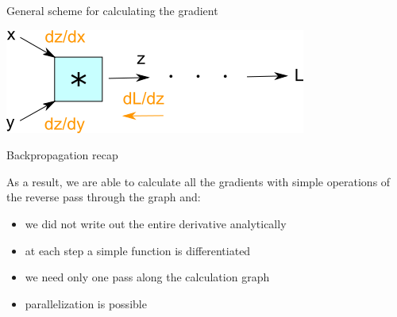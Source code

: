 \documentclass[fullscreen=true, bookmarks=true, hyperref={pdfencoding=unicode}]{beamer}
\begin{document}
\begin{frame}{General scheme for calculating the gradient}

\begin{center}
  \includegraphics[keepaspectratio, width=0.5\paperwidth]{backprop_scheme.png}
\end{center}
\end{frame}


\begin{frame}{Backpropagation recap}

As a result, we are able to calculate all the gradients with simple operations of the reverse pass through the graph and:

\begin{itemize}
    \pause
    \item we did not write out the entire derivative analytically
    \pause
    \item at each step a simple function is differentiated
    \pause
    \item we need only one pass along the calculation graph
    \pause
    \item parallelization is possible
\end{itemize}

\end{frame}
\end{document}
